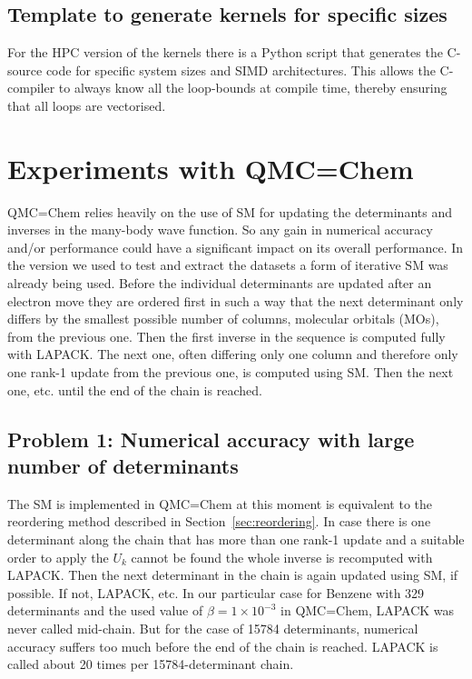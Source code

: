 \documentclass[11pt]{article}
\numberwithin{figure}{section}
\numberwithin{table}{section}
\begin{document}
			\subsection{Template to generate kernels for specific sizes}
				For the HPC version of the kernels there is a Python script that generates the C-source code for specific system sizes and SIMD architectures. This allows the C-compiler to always know all the loop-bounds at compile time, thereby ensuring that all loops are vectorised.
			
	\section{Experiments with QMC=Chem}
	
			QMC=Chem relies heavily on the use of SM for updating the determinants and inverses in the many-body wave function. So any gain in numerical accuracy and/or performance could have a significant impact on its overall performance. In the version we used to test and extract the datasets a form of iterative SM was already being used. Before the individual determinants are updated after an electron move they are ordered first in such a way that the next determinant only differs by the smallest possible number of columns, molecular orbitals (MOs), from the previous one. Then the first inverse in the sequence is computed fully with LAPACK. The next one, often differing only one column and therefore only one rank-1 update from the previous one, is computed using SM. Then the next one, etc. until the end of the chain is reached.
			
			\subsection{Problem 1: Numerical accuracy with large number of determinants}
				The SM is implemented in QMC=Chem at this moment is equivalent to the reordering method described in Section~\ref{sec:reordering}. In case there is one determinant along the chain that has more than one rank-1 update and a suitable order to apply the $U_k$ cannot be found the whole inverse is recomputed with LAPACK. Then the next determinant in the chain is again updated using SM, if possible. If not, LAPACK, etc. In our particular case for Benzene with 329 determinants and the used value of $\beta=1\times 10^{-3}$ in QMC=Chem, LAPACK was never called mid-chain. But for the case of 15784 determinants, numerical accuracy suffers too much before the end of the chain is reached. LAPACK is called about 20 times per 15784-determinant chain.
			
\end{document}

